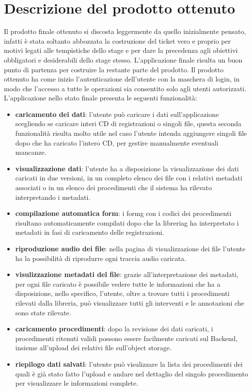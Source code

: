 \section{Descrizione del prodotto ottenuto}
Il prodotto finale ottenuto si discosta leggermente da quello inizialmente pensato, infatti è stata soltanto abbozzata la costruzione del ticket vero e proprio per motivi legati alle
tempistiche dello stage e per dare la precedenza agli obiettivi obbligatori e desiderabili dello stage stesso.
L'applicazione finale risulta un buon punto di partenza per costruire la restante parte del prodotto. Il prodotto ottenuto ha come inizio l'autenticazione dell'utente con
la maschera di login, in modo che l'accesso a tutte le operazioni sia consentito solo agli utenti autorizzati. L'applicazione nello stato finale presenta le seguenti funzionalità:
\begin{itemize}
  \item \textbf{caricamento dei dati}: l'utente può caricare i dati sull'applicazione scegliendo se caricare interi CD di registrazioni o singoli file, questa seconda funzionalità
        risulta molto utile nel caso l'utente intenda aggiungere singoli file dopo che ha caricato l'intero CD, per gestire manualmente eventuali mancanze.
  \item \textbf{visualizzazione dati}: l'utente ha a disposizione la visualizzazione dei dati caricati in due versioni, in un completo elenco dei file con i relativi metadati associati
        o in un elenco dei procedimenti che il sistema ha rilevato interpretando i metadati.
  \item \textbf{compilazione automatica form}: i \gls{formg} con i codici dei procedimenti risultano automaticamente compilati dopo che la \gls{libreriag} ha interpretato i metadati in fasi di caricamento delle registrazioni.
  \item \textbf{riproduzione audio dei file}: nella pagina di visualizzazione dei file l'utente ha la possibilità di riprodurre ogni traccia audio caricata.
  \item \textbf{visulizzazione metadati del file}: grazie all'interpretazione dei metadati, per ogni file caricato è possibile vedere tutte le informazioni che ha a disposizione,
        nello specifico, l'utente, oltre a trovare tutti i procedimenti rilevati dalla libreria, può visualizzare tutti gli interventi e le annotazioni che sono state rilevate.
  \item \textbf{caricamento procedimenti}: dopo la revisione dei dati caricati, i procedimenti ritenuti validi possono essere facilmente caricati sul Backend, insieme all'upload dei relativi file sull'object storage.
  \item \textbf{riepilogo dati salvati}: l'utente può visulizzare la lista dei procedimenti dei quali è già stato fatto l'upload e andare nel dettaglio del singolo procedimento per visualizzare le informazioni complete.
\end{itemize}


